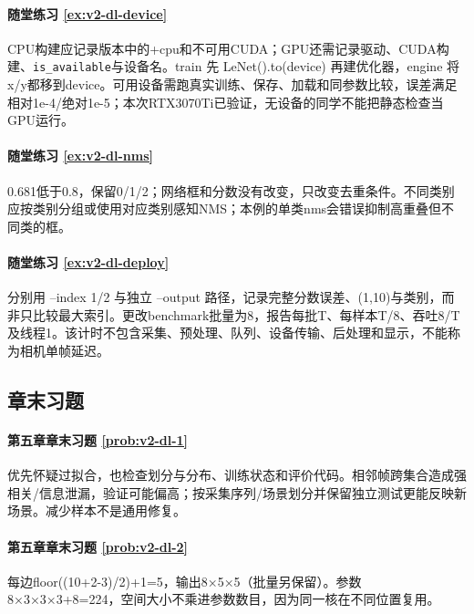 \paragraph*{随堂练习 \ref{ex:v2-dl-device}}
\begin{solution}
CPU构建应记录版本中的+cpu和不可用CUDA；GPU还需记录驱动、CUDA构建、\texttt{is\_available}与设备名。train 先 LeNet().to(device) 再建优化器，engine 将x/y都移到device。可用设备需跑真实训练、保存、加载和同参数比较，误差满足相对1e-4/绝对1e-5；本次RTX3070Ti已验证，无设备的同学不能把静态检查当GPU运行。
\end{solution}

\paragraph*{随堂练习 \ref{ex:v2-dl-nms}}
\begin{solution}
0.681低于0.8，保留0/1/2；网络框和分数没有改变，只改变去重条件。不同类别应按类别分组或使用对应类别感知NMS；本例的单类nms会错误抑制高重叠但不同类的框。
\end{solution}

\paragraph*{随堂练习 \ref{ex:v2-dl-deploy}}
\begin{solution}
分别用 --index 1/2 与独立 --output 路径，记录完整分数误差、(1,10)与类别，而非只比较最大索引。更改benchmark批量为8，报告每批T、每样本T/8、吞吐8/T及线程1。该计时不包含采集、预处理、队列、设备传输、后处理和显示，不能称为相机单帧延迟。
\end{solution}

\subsection*{章末习题}
\paragraph*{第五章章末习题 \ref{prob:v2-dl-1}}
\begin{solution}
优先怀疑过拟合，也检查划分与分布、训练状态和评价代码。相邻帧跨集合造成强相关/信息泄漏，验证可能偏高；按采集序列/场景划分并保留独立测试更能反映新场景。减少样本不是通用修复。
\end{solution}
\paragraph*{第五章章末习题 \ref{prob:v2-dl-2}}
\begin{solution}
每边floor((10+2-3)/2)+1=5，输出8×5×5（批量另保留）。参数8×3×3×3+8=224，空间大小不乘进参数数目，因为同一核在不同位置复用。
\end{solution}
